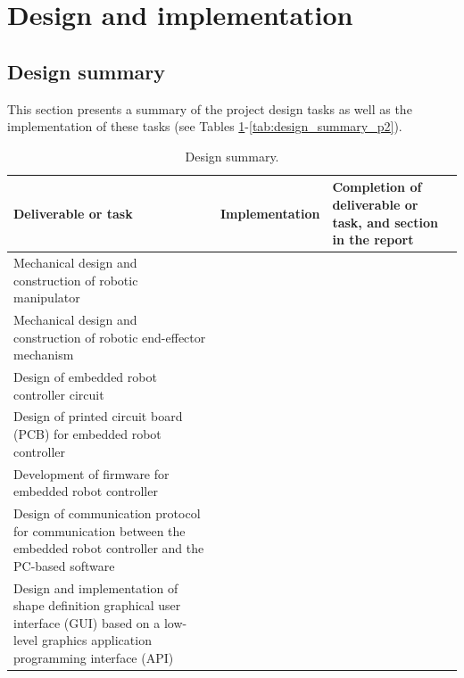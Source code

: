 
\section{Design and implementation}


\subsection{Design summary}

This section presents a summary of the project design tasks as well as the implementation of these tasks (see Tables \ref{tab:design_summary_p1}-\ref{tab:design_summary_p2}).

\begin{table}[h]
	\renewcommand{\arraystretch}{1.3}
	\centering
	\begin{tabular}{|>{\raggedright}m{5cm}|>{\raggedright}m{4cm}|>{\raggedright\arraybackslash}m{4cm}|}
		\hline
		\textbf{Deliverable or task} & \textbf{Implementation} & \textbf{Completion of deliverable or task, and section in the report} \\
		\hline
		Mechanical design and construction of robotic manipulator & & \\
		\hline
		Mechanical design and construction of robotic end-effector mechanism & & \\
		\hline
		Design of embedded robot controller circuit & & \\
		\hline
		Design of printed circuit board (PCB) for embedded robot controller & & \\
		\hline
		Development of firmware for embedded robot controller & & \\
		\hline
		Design of communication protocol for communication between the embedded robot controller and the PC-based software & & \\
		\hline
		Design and implementation of shape definition graphical user interface (GUI) based on a low-level graphics application programming interface (API) & & \\
		\hline
	\end{tabular}
	\caption{\label{tab:design_summary_p1}Design summary.}
\end{table}

